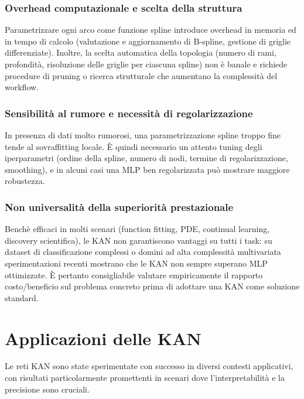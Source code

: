 \documentclass[a4paper,12pt]{report}
\begin{document}
	\subsubsection{Overhead computazionale e scelta della struttura}
	Parametrizzare ogni arco come funzione spline introduce overhead in memoria ed in tempo di calcolo (valutazione e aggiornamento di B-spline, gestione di griglie differenziate). Inoltre, la scelta automatica della topologia (numero di rami, profondità, risoluzione delle griglie per ciascuna spline) non è banale e richiede procedure di pruning o ricerca strutturale che aumentano la complessità del workflow.
	
	\subsubsection{Sensibilità al rumore e necessità di regolarizzazione}
	In presenza di dati molto rumorosi, una parametrizzazione spline troppo fine tende al sovraffitting locale. È quindi necessario un attento tuning degli iperparametri (ordine della spline, numero di nodi, termine di regolarizzazione, smoothing), e in alcuni casi una MLP ben regolarizzata può mostrare maggiore robustezza.
	
	\subsubsection{Non universalità della superiorità prestazionale}
	Benchè efficaci in molti scenari (function fitting, PDE, continual learning, discovery scientifica), le KAN non garantiscono vantaggi su tutti i task: su dataset di classificazione complessi o domini ad alta complessità multivariata sperimentazioni recenti mostrano che le KAN non sempre superano MLP ottimizzate. È pertanto consigliabile valutare empiricamente il rapporto costo/beneficio sul problema concreto prima di adottare una KAN come soluzione standard.
	
	\section{Applicazioni delle KAN}
	Le reti KAN sono state sperimentate con successo in diversi contesti applicativi, con risultati particolarmente promettenti in scenari dove l'interpretabilità e la precisione sono cruciali.
	
\end{document}
